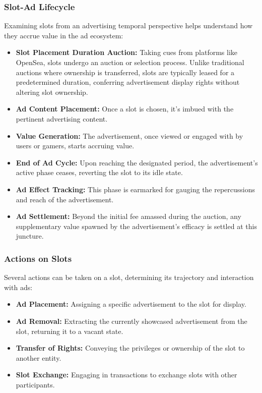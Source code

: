 \subsubsection{Slot-Ad Lifecycle}

Examining slots from an advertising temporal perspective helps understand how they accrue value in the ad ecosystem:

\begin{itemize}
    \item \textbf{Slot Placement Duration Auction:} Taking cues from platforms like OpenSea, slots undergo an auction or selection process. Unlike traditional auctions where ownership is transferred, slots are typically leased for a predetermined duration, conferring advertisement display rights without altering slot ownership.
    
    \item \textbf{Ad Content Placement:} Once a slot is chosen, it's imbued with the pertinent advertising content.
    
    \item \textbf{Value Generation:} The advertisement, once viewed or engaged with by users or gamers, starts accruing value.
    
    \item \textbf{End of Ad Cycle:} Upon reaching the designated period, the advertisement's active phase ceases, reverting the slot to its idle state.
    
    \item \textbf{Ad Effect Tracking:} This phase is earmarked for gauging the repercussions and reach of the advertisement.
    
    \item \textbf{Ad Settlement:} Beyond the initial fee amassed during the auction, any supplementary value spawned by the advertisement's efficacy is settled at this juncture.
\end{itemize}

\subsubsection{Actions on Slots}
Several actions can be taken on a slot, determining its trajectory and interaction with ads:

\begin{itemize}
    \item \textbf{Ad Placement:} Assigning a specific advertisement to the slot for display.
    
    \item \textbf{Ad Removal:} Extracting the currently showcased advertisement from the slot, returning it to a vacant state.
    
    \item \textbf{Transfer of Rights:} Conveying the privileges or ownership of the slot to another entity.
    
    \item \textbf{Slot Exchange:} Engaging in transactions to exchange slots with other participants.
\end{itemize}


